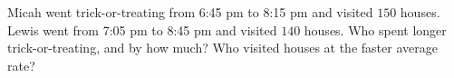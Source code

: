 Micah went trick-or-treating from 6:45 pm to 8:15 pm and visited $150$ houses. Lewis went from 7:05 pm to 8:45 pm and visited $140$ houses. Who spent longer trick-or-treating, and by how much? Who visited houses at the faster average rate?
